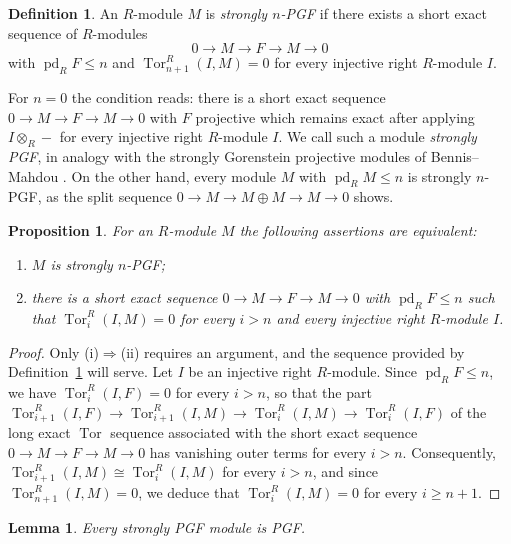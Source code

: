 \documentclass[12pt]{amsart}
\newtheorem{proposition}[theorem]{Proposition}
\newtheorem{lemma}[theorem]{Lemma}
\theoremstyle{remark}
\theoremstyle{definition}
\newtheorem{definition}[theorem]{Definition}
\theoremstyle{plain}
\DeclareMathOperator{\pd}{pd}
\DeclareMathOperator{\Tor}{Tor}
\begin{document}
\begin{definition}\label{defA.1}
An $R$-module $M$ is \emph{strongly $n$-PGF} if there exists a short exact sequence of $R$-modules
\[
0\rightarrow M\rightarrow F\rightarrow M\rightarrow0
\]
with $\pd_RF\le n$ and $\Tor^R_{n+1}(I,M)=0$ for every injective right $R$-module $I$.
\end{definition}

For $n=0$ the condition reads: there is a short exact sequence $0\to M\to F\to M\to0$ with $F$ projective which remains exact after applying $I\otimes_R-$ for every injective right $R$-module $I$. We call such a module \emph{strongly PGF}, in analogy with the strongly Gorenstein projective modules of Bennis--Mahdou \cite{BM}. On the other hand, every module $M$ with $\pd_RM\le n$ is strongly $n$-PGF, as the split sequence $0\to M\to M\oplus M\to M\to0$ shows.

\begin{proposition}\label{propA.2}
For an $R$-module $M$ the following assertions are equivalent:
\begin{enumerate}
\item[(i)] $M$ is strongly $n$-PGF;
\item[(ii)] there is a short exact sequence $0\to M\to F\to M\to0$ with $\pd_RF\le n$ such that $\Tor^R_i(I,M)=0$ for every $i>n$ and every injective right $R$-module $I$.
\end{enumerate}
\end{proposition}

\begin{proof}
Only (i)$\Rightarrow$(ii) requires an argument, and the sequence provided by Definition~\ref{defA.1} will serve. Let $I$ be an injective right $R$-module. Since $\pd_RF\le n$, we have $\Tor^R_i(I,F)=0$ for every $i>n$, so that the part $\Tor^R_{i+1}(I,F)\rightarrow\Tor^R_{i+1}(I,M)\rightarrow\Tor^R_i(I,M)\rightarrow\Tor^R_i(I,F)$
of the long exact $\Tor$ sequence associated with the short exact sequence $0\to M\to F\to M\to0$ has vanishing outer terms for every $i>n$. Consequently, $\Tor^R_{i+1}(I,M)\cong\Tor^R_i(I,M)$ for every $i>n$, and since $\Tor^R_{n+1}(I,M)=0$, we deduce that $\Tor^R_i(I,M)=0$ for every $i\ge n+1$.
\end{proof}

\begin{lemma}\label{lemA.3}
Every strongly PGF module is PGF.
\end{lemma}
\end{document}
